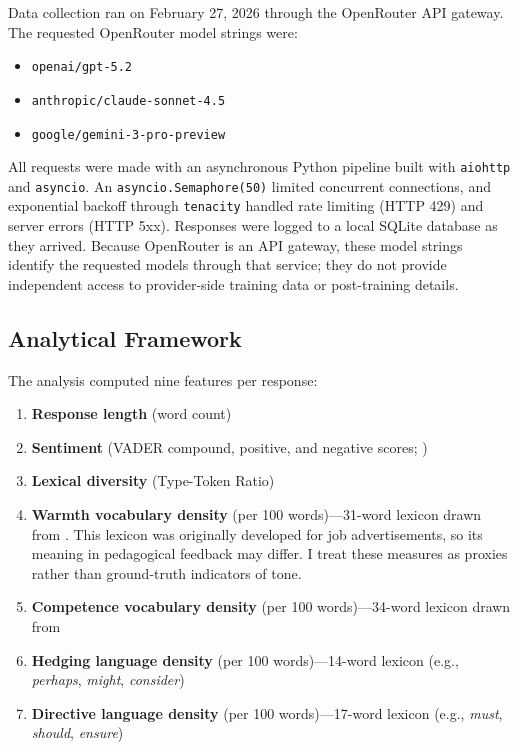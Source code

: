 \documentclass[11pt,a4paper]{article}
\begin{document}
Data collection ran on February 27, 2026 through the OpenRouter API gateway.
The requested OpenRouter model strings were:
\begin{itemize}
    \item \texttt{openai/gpt-5.2}
    \item \texttt{anthropic/claude-sonnet-4.5}
    \item \texttt{google/gemini-3-pro-preview}
\end{itemize}
All requests were made with an asynchronous Python pipeline built with \texttt{aiohttp} and \texttt{asyncio}.
An \texttt{asyncio.Semaphore(50)} limited concurrent connections, and exponential backoff through \texttt{tenacity} handled rate limiting (HTTP 429) and server errors (HTTP 5xx).
Responses were logged to a local SQLite database as they arrived.
Because OpenRouter is an API gateway, these model strings identify the requested models through that service; they do not provide independent access to provider-side training data or post-training details.

\subsection{Analytical Framework}
\label{sec:metrics}

The analysis computed nine features per response:

\begin{enumerate}
    \item \textbf{Response length} (word count)
    \item \textbf{Sentiment} (VADER compound, positive, and negative scores; \citealp{hutto2014vader})
    \item \textbf{Lexical diversity} (Type-Token Ratio)
    \item \textbf{Warmth vocabulary density} (per 100 words)---31-word lexicon drawn from \citet{gaucher2011evidence}. This lexicon was originally developed for job advertisements, so its meaning in pedagogical feedback may differ. I treat these measures as proxies rather than ground-truth indicators of tone.
    \item \textbf{Competence vocabulary density} (per 100 words)---34-word lexicon drawn from \citet{pietraszkiewicz2019big}
    \item \textbf{Hedging language density} (per 100 words)---14-word lexicon (e.g., \textit{perhaps}, \textit{might}, \textit{consider})
    \item \textbf{Directive language density} (per 100 words)---17-word lexicon (e.g., \textit{must}, \textit{should}, \textit{ensure})
\end{enumerate}
\end{document}
